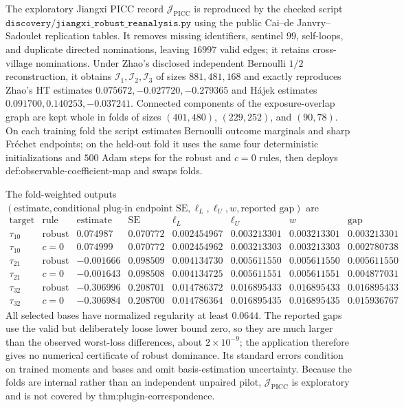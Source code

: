 The exploratory Jiangxi PICC record \(\mathcal J_{\mathrm{PICC}}\) is reproduced by the checked script \(\texttt{discovery/jiangxi\_robust\_reanalysis.py}\) using the public Cai--de Janvry--Sadoulet replication tables.  It removes missing identifiers, sentinel \(99\), self-loops, and duplicate directed nominations, leaving \(16997\) valid edges; it retains cross-village nominations.  Under Zhao's disclosed independent Bernoulli \(1/2\) reconstruction, it obtains \(\mathcal I_1,\mathcal I_2,\mathcal I_3\) of sizes \(881,481,168\) and exactly reproduces Zhao's HT estimates \(0.075672,-0.027720,-0.279365\) and H\'ajek estimates \(0.091700,0.140253,-0.037241\).  Connected components of the exposure-overlap graph are kept whole in folds of sizes \((401,480)\), \((229,252)\), and \((90,78)\).  On each training fold the script estimates Bernoulli outcome marginals and sharp Fr\'echet endpoints; on the held-out fold it uses the same four deterministic initializations and \(500\) Adam steps for the robust and \(c=0\) rules, then deploys def:observable-coefficient-map and swaps folds.

The fold-weighted outputs \((\text{estimate},\text{conditional plug-in endpoint SE},\ell_L,\ell_U,w,\text{reported gap})\) are
\[
\begin{array}{c|c|rrrrrr}
\text{target}&\text{rule}&\text{estimate}&\text{SE}&\ell_L&\ell_U&w&\text{gap}\\\hline
\tau_{10}&\text{robust}&0.074987&0.070772&0.002454967&0.003213301&0.003213301&0.003213301\\
\tau_{10}&c=0&0.074999&0.070772&0.002454962&0.003213303&0.003213303&0.002780738\\
\tau_{21}&\text{robust}&-0.001666&0.098509&0.004134730&0.005611550&0.005611550&0.005611550\\
\tau_{21}&c=0&-0.001643&0.098508&0.004134725&0.005611551&0.005611551&0.004877031\\
\tau_{32}&\text{robust}&-0.306996&0.208701&0.014786372&0.016895433&0.016895433&0.016895433\\
\tau_{32}&c=0&-0.306984&0.208700&0.014786364&0.016895435&0.016895435&0.015936767
\end{array}
\]
All selected bases have normalized regularity at least \(0.0644\).  The reported gaps use the valid but deliberately loose lower bound zero, so they are much larger than the observed worst-loss differences, about \(2\times10^{-9}\); the application therefore gives no numerical certificate of robust dominance.  Its standard errors condition on trained moments and bases and omit basis-estimation uncertainty.  Because the folds are internal rather than an independent unpaired pilot, \(\mathcal J_{\mathrm{PICC}}\) is exploratory and is not covered by thm:plugin-correspondence.